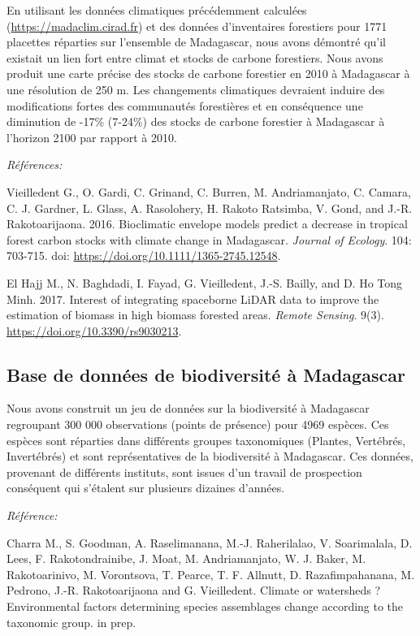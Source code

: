 \documentclass[12pt,]{article}
\begin{document}
En utilisant les données climatiques précédemment calculées
(\url{https://madaclim.cirad.fr}) et des données d'inventaires
forestiers pour 1771 placettes réparties sur l'ensemble de Madagascar,
nous avons démontré qu'il existait un lien fort entre climat et stocks
de carbone forestiers. Nous avons produit une carte précise des stocks
de carbone forestier en 2010 à Madagascar à une résolution de 250 m. Les
changements climatiques devraient induire des modifications fortes des
communautés forestières et en conséquence une diminution de -17\%
(7-24\%) des stocks de carbone forestier à Madagascar à l'horizon 2100
par rapport à 2010.

\emph{Références:}

Vieilledent G., O. Gardi, C. Grinand, C. Burren, M. Andriamanjato, C.
Camara, C. J. Gardner, L. Glass, A. Rasolohery, H. Rakoto Ratsimba, V.
Gond, and J.-R. Rakotoarijaona. 2016. Bioclimatic envelope models
predict a decrease in tropical forest carbon stocks with climate change
in Madagascar. \emph{Journal of Ecology}. 104: 703-715. doi:
\url{https://doi.org/10.1111/1365-2745.12548}.

El Hajj M., N. Baghdadi, I. Fayad, G. Vieilledent, J.-S. Bailly, and D.
Ho Tong Minh. 2017. Interest of integrating spaceborne LiDAR data to
improve the estimation of biomass in high biomass forested areas.
\emph{Remote Sensing}. 9(3). \url{https://doi.org/10.3390/rs9030213}.

\hypertarget{base-de-donnees-de-biodiversite-a-madagascar}{%
\subsection{Base de données de biodiversité à
Madagascar}\label{base-de-donnees-de-biodiversite-a-madagascar}}

Nous avons construit un jeu de données sur la biodiversité à Madagascar
regroupant 300 000 observations (points de présence) pour 4969 espèces.
Ces espèces sont réparties dans différents groupes taxonomiques
(Plantes, Vertébrés, Invertébrés) et sont représentatives de la
biodiversité à Madagascar. Ces données, provenant de différents
instituts, sont issues d'un travail de prospection conséquent qui
s'étalent sur plusieurs dizaines d'années.

\emph{Référence:}

Charra M., S. Goodman, A. Raselimanana, M.-J. Raherilalao, V.
Soarimalala, D. Lees, F. Rakotondrainibe, J. Moat, M. Andriamanjato, W.
J. Baker, M. Rakotoarinivo, M. Vorontsova, T. Pearce, T. F. Allnutt, D.
Razafimpahanana, M. Pedrono, J.-R. Rakotoarijaona and G. Vieilledent.
Climate or watersheds ? Environmental factors determining species
assemblages change according to the taxonomic group. in prep.
\end{document}
